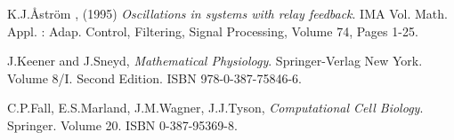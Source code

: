 \documentclass[a4paper]{article}
\begin{document}
\begin{thebibliography}{9}

K.J.\r{A}str\"{o}m , (1995) \emph{Oscillations in systems with relay feedback}. IMA Vol. Math. Appl. : Adap. Control, Filtering, Signal Processing, Volume 74, Pages 1-25. 

J.Keener and J.Sneyd, \emph{Mathematical Physiology}. Springer-Verlag New York. Volume 8/I. Second Edition. ISBN 978-0-387-75846-6. 

C.P.Fall, E.S.Marland, J.M.Wagner, J.J.Tyson, \emph{Computational Cell Biology}. Springer. Volume 20. ISBN 0-387-95369-8. 

\end{thebibliography}
\end{document}
